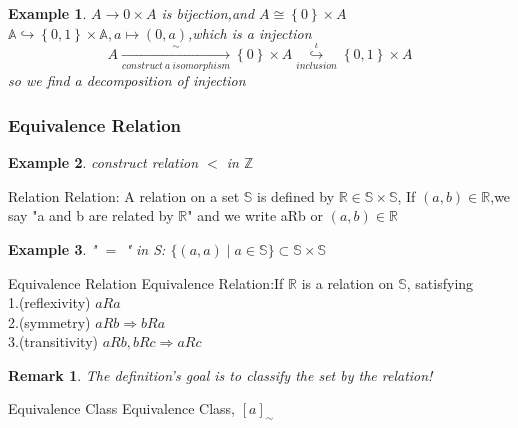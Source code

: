 \documentclass[13pt, a4paper, oneside]{book}
\newtheorem{remark}{Remark}[section]
\newtheorem{example}{Example}[section]
\begin{document}
	\begin{example}
		$ A \rightarrow {0} \times A $ is bijection,and $A \cong \left\{ 0 \right\} \times A$ \\
		$ \mathbb{A} \hookrightarrow \left\{ 0,1 \right\} \times \mathbb{A},a \longmapsto (0,a) $,which is a injection \\
		$$ A \underset{construct~a~isomorphism}{\overset{ \sim }{ \longrightarrow }} \left\{0\right\} \times A \overset{\iota}{\underset{inclusion}{\hookrightarrow}} \left\{0,1\right\} \times A $$
		so we find a decomposition of injection 
		
	\end{example}

	\subsubsection{Equivalence Relation}  %
	
	\begin{example}
		construct relation $<$ in $\mathbb{Z}$
	\end{example}
	
	\begin{definition}{Relation}{}
		Relation: A relation on a set $\mathbb{S}$ is defined by $\mathbb{R} \in \mathbb{S} \times \mathbb{S}$, If $(a,b) \in \mathbb{R}$,we say "a and b are related by $\mathbb{R}$" and we write aRb or $(a,b) \in \mathbb{R}$
	\end{definition}
	
	\begin{example}
		" $ = $ " in S: $ \{ (a,a) \mid a \in \mathbb{S} \} \subset \mathbb{S} \times \mathbb{S} $
	\end{example}
	
	\begin{definition}{Equivalence Relation}{}
		Equivalence Relation:If $\mathbb{R}$ is a relation on $\mathbb{S}$, satisfying \\
		1.(reflexivity) $aRa$ \\
		2.(symmetry) $aRb \Longrightarrow bRa$ \\
		3.(transitivity) $aRb,bRc \Longrightarrow aRc$
	\end{definition}
	
	\begin{remark}
		The definition's goal is to classify the set by the relation! 
	\end{remark}
	
	\begin{definition}{Equivalence Class}{}
		Equivalence Class, $ \left[ a \right]_{\sim} $
	\end{definition}
\end{document}
